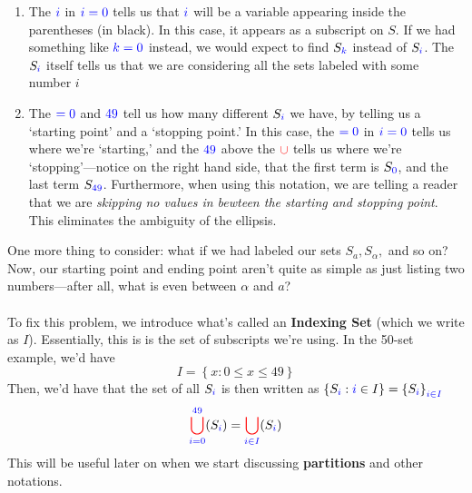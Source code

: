 \documentclass[10pt]{article}
\theoremstyle{definition}
\newcommand{\set}[1]{\left\{ #1 \right\}}
\begin{document}
\begin{enumerate}[label=\alph*)]
    \item The $\color{blue} i$ in $\color{blue}i=0$ tells us that $\color{blue}i$ will be a variable appearing inside the parentheses (in black).  In this case, it appears as a subscript on $S$.  If we had something like $\color{blue}k=0$ instead, we would expect to find $S_{\color{blue}k}$ instead of $S_{\color{blue}i}$.  The $S_{\color{blue} i}$ itself tells us that we are considering all the sets labeled with some number $i$
    \item The $\color{blue}=0$ and $\color{blue}49$ tell us how many different $S_{\color{blue}i}$ we have, by telling us a `starting point' and a `stopping point.'  In this case, the $\color{blue} =0$ in $\color{blue}i=0$ tells us where we're `starting,' and the $\color{blue}49$ above the $\textcolor{red}{\cup}$ tells us where we're `stopping'---notice on the right hand side, that the first term is $S_{\color{blue}0}$, and the last term $S_{\textcolor{blue}{49}}$.  Furthermore, when using this notation, we are telling a reader that we are \emph{skipping no values in bewteen the starting and stopping point}.  This eliminates the ambiguity of the ellipsis.  
\end{enumerate}  
One more thing to consider: what if we had labeled our sets $S_a, S_{\alpha},$ and so on?  Now, our starting point and ending point aren't quite as simple as just listing two numbers---after all, what is even between $\alpha$ and $a$?\\~\\
To fix this problem, we introduce what's called an \textbf{Indexing Set} (which we write as $I$).  Essentially, this is is the set of subscripts we're using.  In the 50-set example, we'd have
\[I = \set{x:0\leq x\leq49}\]
Then, we'd have that the set of all $S_{\color{blue}i}$ is then written as $\set{S_{\color{blue}i}:{\color{blue}i}\in I} = \set{S_{\color{blue}i}}_{\color{blue}i\in I}$
\[{\color{red}\bigcup^{{\color{blue}49}}_{\color{blue}i={0}}}(S_{\color{blue}i}) = {\color{red}\bigcup_{\color{blue}i\in I}}(S_{\color{blue}i})\]
This will be useful later on when we start discussing \textbf{partitions} and other notations.
\end{document}
